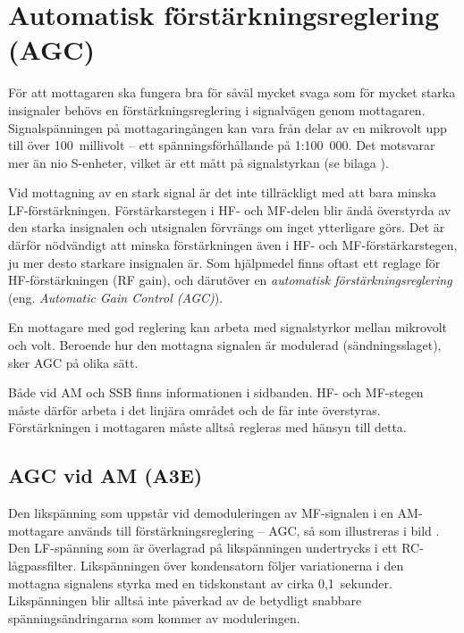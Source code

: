 \section[AGC]{Automatisk förstärknings\-reglering (AGC)}
\label{AGC}

För att mottagaren ska fungera bra för såväl mycket svaga som för mycket starka
insignaler behövs en förstärkningsreglering i signalvägen genom mottagaren.
Signalspänningen på mottagaringången kan vara från delar av en mikrovolt upp
till över 100~millivolt -- ett spänningsförhållande på 1:100~000.
Det motsvarar mer än nio S-enheter, vilket är ett mått på signalstyrkan
(se bilaga ).

Vid mottagning av en stark signal är det inte tillräckligt med att
bara minska LF-förstärkningen.
Förstärkarstegen i HF- och MF-delen blir ändå överstyrda av den starka
insignalen och utsignalen förvrängs om inget ytterligare görs.
Det är därför nödvändigt att minska förstärkningen även i HF- och
MF-förstärkarstegen, ju mer desto starkare insignalen är.
Som hjälpmedel finns oftast ett reglage för HF-förstärkningen (RF gain), och
därutöver en \emph{automatisk förstärkningsreglering} (eng. \emph{Automatic
Gain Control (AGC)}).

En mottagare med god reglering kan arbeta med signalstyrkor mellan mikrovolt
och volt.
Beroende hur den mottagna signalen är modulerad (sändningsslaget), sker AGC
på olika sätt.

Både vid AM och SSB finns informationen i sidbanden.
HF- och MF-stegen måste därför arbeta i det linjära området och de får inte
överstyras.
Förstärkningen i mottagaren måste alltså regleras med hänsyn till detta.

\subsection{AGC vid AM (A3E)}


Den likspänning som uppstår vid demoduleringen av MF-signalen i en
AM-mottagare används till förstärkningsreglering -- AGC, så som illustreras
i bild .
Den LF-spänning som är överlagrad på likspänningen undertrycks i ett
RC-lågpassfilter.
Likspänningen över kondensatorn följer variationerna i den mottagna signalens
styrka med en tidskonstant av cirka 0,1~sekunder.
Likspänningen blir alltså inte påverkad av de betydligt snabbare
spänningsändringarna som kommer av moduleringen.

